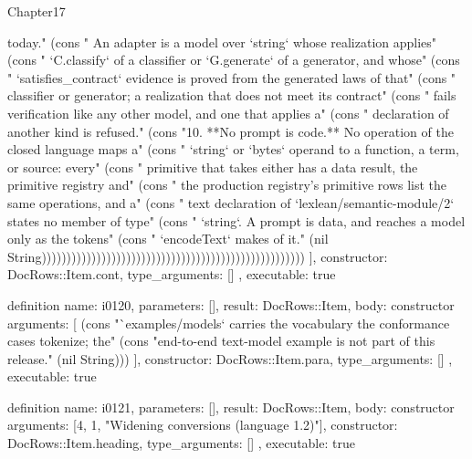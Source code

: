 \begin{lexlean}{Chapter17}
\begin{semanticmodule}
{{today." (cons "   An adapter is a model over `string` whose realization applies" (cons "   `C.classify` of a classifier or `G.generate` of a generator, and whose" (cons "   `satisfies_contract` evidence is proved from the generated laws of that" (cons "   classifier or generator; a realization that does not meet its contract" (cons "   fails verification like any other model, and one that applies a" (cons "   declaration of another kind is refused." (cons "10. **No prompt is code.** No operation of the closed language maps a" (cons "   `string` or `bytes` operand to a function, a term, or source: every" (cons "   primitive that takes either has a data result, the primitive registry and" (cons "   the production registry's primitive rows list the same operations, and a" (cons "   text declaration of `lexlean/semantic-module/2` states no member of type" (cons "   `string`. A prompt is data, and reaches a model only as the tokens" (cons "   `encodeText` makes of it." (nil String)))))))))))))))))))))))))))))))))))))))))))))))))))))
    ],
    constructor: DocRows::Item.cont,
    type_arguments: []
  },
  executable: true
}

definition{
  name: i0120,
  parameters: [],
  result: DocRows::Item,
  body: constructor{
    arguments: [
      (cons "`examples/models` carries the vocabulary the conformance cases tokenize; the" (cons "end-to-end text-model example is not part of this release." (nil String)))
    ],
    constructor: DocRows::Item.para,
    type_arguments: []
  },
  executable: true
}

definition{
  name: i0121,
  parameters: [],
  result: DocRows::Item,
  body: constructor{
    arguments: [4, 1, "Widening conversions (language 1.2)"],
    constructor: DocRows::Item.heading,
    type_arguments: []
  },
  executable: true
}


\end{semanticmodule}
\end{lexlean}
